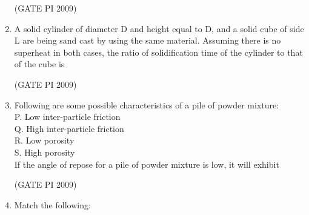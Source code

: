 \documentclass[journal,12pt,onecolumn]{IEEEtran}
\theoremstyle{remark}
\begin{document}
\begin{enumerate}
\begin{enumerate}
\end{enumerate}
\hfill (GATE PI 2009)
\item A solid cylinder of diameter D and height equal to D, and a solid cube of side L are being sand cast by using the same material. Assuming there is no superheat in both cases, the ratio of solidification time of the cylinder to that of the cube is
\begin{enumerate}
\end{enumerate}
\hfill (GATE PI 2009)
\item Following are some possible characteristics of a pile of powder mixture: \\
P. Low inter-particle friction \\
Q. High inter-particle friction \\
R. Low porosity \\
S. High porosity \\
If the angle of repose for a pile of powder mixture is low, it will exhibit
\begin{enumerate}
\end{enumerate}
\hfill (GATE PI 2009)
\item Match the following:


\end{enumerate}
\end{document}
